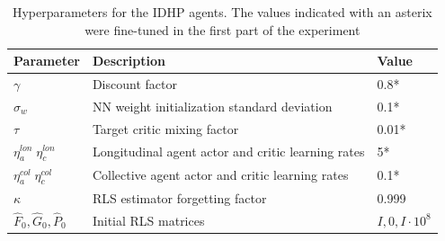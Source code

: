 \begin{table}[]
    \centering
    \caption{Hyperparameters for the IDHP agents. The values indicated with an asterix were fine-tuned in the first part of the experiment}
    \label{tab:hyperparams}
    \begin{tabular}{@{}lll@{}}
\toprule
Parameter                         & Description                                        & Value              \\ \midrule
$\gamma$                          & Discount factor                                    & 0.8*               \\
$\sigma_w$                        & NN weight initialization standard deviation        & 0.1*               \\
$\tau$                            & Target critic mixing factor                        & 0.01*              \\
$\eta^{lon}_{a} \; \eta^{lon}_c$  & Longitudinal agent actor and critic learning rates & 5*                 \\
$\eta^{col}_{a} \; \eta^{col}_c$  & Collective agent actor and critic learning rates                    & 0.1*               \\
$\kappa$                          & RLS estimator forgetting factor                    & 0.999              \\
$\hat{F}_0, \hat{G}_0, \hat{P}_0$ & Initial RLS matrices                               & $I, 0, I\cdot10^8$ \\ \bottomrule
\end{tabular}
\end{table}